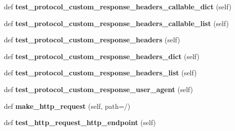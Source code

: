 \begin{DoxyCompactItemize}
def {\bfseries test\+\_\+protocol\+\_\+custom\+\_\+response\+\_\+headers\+\_\+callable\+\_\+dict} (self)
\item 
\mbox{\label{classwebsockets_1_1test__client__server_1_1_client_server_tests_a434d620137589ca12d672c9fa532e8ab}} 
def {\bfseries test\+\_\+protocol\+\_\+custom\+\_\+response\+\_\+headers\+\_\+callable\+\_\+list} (self)
\item 
\mbox{\label{classwebsockets_1_1test__client__server_1_1_client_server_tests_ace73c70192d1738740d8c2dacb04941f}} 
def {\bfseries test\+\_\+protocol\+\_\+custom\+\_\+response\+\_\+headers} (self)
\item 
\mbox{\label{classwebsockets_1_1test__client__server_1_1_client_server_tests_aa19b55c33583e8cca6a5c8581991f896}} 
def {\bfseries test\+\_\+protocol\+\_\+custom\+\_\+response\+\_\+headers\+\_\+dict} (self)
\item 
\mbox{\label{classwebsockets_1_1test__client__server_1_1_client_server_tests_a2e5dc0a2afcbec73c2e1bb6e33aad83a}} 
def {\bfseries test\+\_\+protocol\+\_\+custom\+\_\+response\+\_\+headers\+\_\+list} (self)
\item 
\mbox{\label{classwebsockets_1_1test__client__server_1_1_client_server_tests_a1cd62d086ce65796757147f6abb7d637}} 
def {\bfseries test\+\_\+protocol\+\_\+custom\+\_\+response\+\_\+user\+\_\+agent} (self)
\item 
\mbox{\label{classwebsockets_1_1test__client__server_1_1_client_server_tests_ab230019fb68927c484f6c4da750310e0}} 
def {\bfseries make\+\_\+http\+\_\+request} (self, path=\textquotesingle{}/\textquotesingle{})
\item 
\mbox{\label{classwebsockets_1_1test__client__server_1_1_client_server_tests_aa770aa1f667cf5b8b58bdd281cf1e2c1}} 
def {\bfseries test\+\_\+http\+\_\+request\+\_\+http\+\_\+endpoint} (self)

\end{DoxyCompactItemize}

